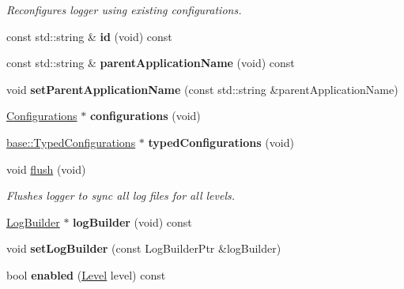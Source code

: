 \begin{DoxyCompactItemize}
\begin{DoxyCompactList}\small\item\em Reconfigures logger using existing configurations. \end{DoxyCompactList}\item 
\hypertarget{classel_1_1Logger_ae51a621df3c835f51f450134ba66f8ac}{const std\-::string \& {\bfseries id} (void) const }\label{classel_1_1Logger_ae51a621df3c835f51f450134ba66f8ac}

\item 
\hypertarget{classel_1_1Logger_a9e56e468bccd7b52281e7bbc75892431}{const std\-::string \& {\bfseries parent\-Application\-Name} (void) const }\label{classel_1_1Logger_a9e56e468bccd7b52281e7bbc75892431}

\item 
\hypertarget{classel_1_1Logger_a6890af8910adba26b01ef029429c4f15}{void {\bfseries set\-Parent\-Application\-Name} (const std\-::string \&parent\-Application\-Name)}\label{classel_1_1Logger_a6890af8910adba26b01ef029429c4f15}

\item 
\hypertarget{classel_1_1Logger_aeb57aeaddbb3dcd0cb96114019817142}{\hyperlink{classel_1_1Configurations}{Configurations} $\ast$ {\bfseries configurations} (void)}\label{classel_1_1Logger_aeb57aeaddbb3dcd0cb96114019817142}

\item 
\hypertarget{classel_1_1Logger_ac1d34e77892ea506b011d5279b6b139d}{\hyperlink{classel_1_1base_1_1TypedConfigurations}{base\-::\-Typed\-Configurations} $\ast$ {\bfseries typed\-Configurations} (void)}\label{classel_1_1Logger_ac1d34e77892ea506b011d5279b6b139d}

\item 
\hypertarget{classel_1_1Logger_a9a89d454008b1ee1a197eec4b92ce22a}{void \hyperlink{classel_1_1Logger_a9a89d454008b1ee1a197eec4b92ce22a}{flush} (void)}\label{classel_1_1Logger_a9a89d454008b1ee1a197eec4b92ce22a}

\begin{DoxyCompactList}\small\item\em Flushes logger to sync all log files for all levels. \end{DoxyCompactList}\item 
\hypertarget{classel_1_1Logger_aead5b130c5141d2024740b03ab4b45d7}{\hyperlink{classel_1_1LogBuilder}{Log\-Builder} $\ast$ {\bfseries log\-Builder} (void) const }\label{classel_1_1Logger_aead5b130c5141d2024740b03ab4b45d7}

\item 
\hypertarget{classel_1_1Logger_a737340322cc9d9d20febd7131c1e262f}{void {\bfseries set\-Log\-Builder} (const Log\-Builder\-Ptr \&log\-Builder)}\label{classel_1_1Logger_a737340322cc9d9d20febd7131c1e262f}

\item 
\hypertarget{classel_1_1Logger_a5abaca24ac28bfd4806bea32be193435}{bool {\bfseries enabled} (\hyperlink{namespaceel_ab0ac6091262344c52dd2d3ad099e8e36}{Level} level) const }\label{classel_1_1Logger_a5abaca24ac28bfd4806bea32be193435}

\end{DoxyCompactItemize}
